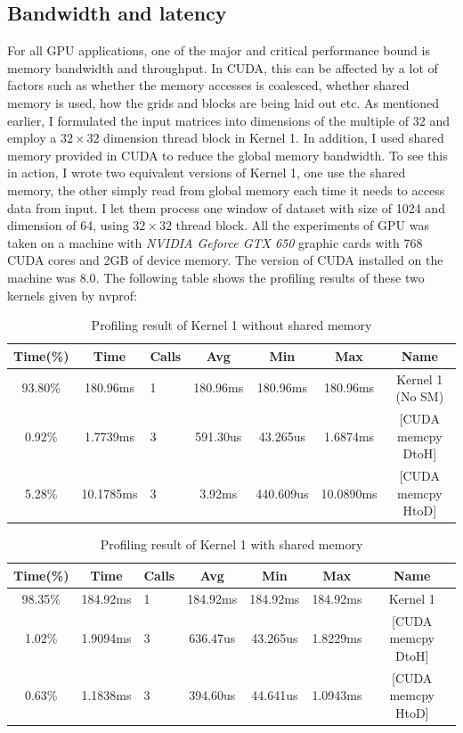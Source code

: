 \documentclass[11pt]{article}       %
\begin{document}
\subsection{Bandwidth and latency}

For all GPU applications, one of the major and critical performance bound is memory bandwidth and throughput. In CUDA, this can be affected by a lot of factors such as whether the memory accesses is coalesced, whether shared memory is used, how the grids and blocks are being laid out etc. As mentioned earlier, I formulated the input matrices into dimensions of the multiple of 32 and employ a $32 \times 32$ dimension thread block in Kernel 1. In addition, I used shared memory provided in CUDA to reduce the global memory bandwidth. To see this in action, I wrote two equivalent versions of Kernel 1, one use the shared memory, the other simply read from global memory each time it needs to access data from input. I let them process one window of dataset with size of 1024 and dimension of 64, using $32 \times 32$ thread block. All the experiments of GPU was taken on a machine with \textit{NVIDIA Geforce GTX 650} graphic cards with 768 CUDA cores and 2GB of device memory.  The version of CUDA installed on the machine was $8.0$. The following table shows the profiling results of these two kernels given by nvprof:

\begin{table}[ht]
\centering
\caption{Profiling result of Kernel 1 without shared memory}
\begin{tabular}{|c|c|l|c|c|c|c|} 
\hline
Time(\%) & Time      & Calls & Avg      & Min& Max& Name                            \\ 
\hline
93.80\%  & 180.96ms  & 1     & 180.96ms & 180.96ms& 180.96ms& Kernel 1 (No SM)              \\ 
\hline
0.92\%   & 1.7739ms  & 3     & 591.30us & 43.265us& 1.6874ms& [CUDA memcpy DtoH]    \\ 
\hline
5.28\%   & 10.1785ms & 3     & 3.92ms   & 440.609us& 10.0890ms& [CUDA memcpy HtoD]  \\
\hline
\end{tabular}
\end{table}

\begin{table}[ht]
\centering
\caption{Profiling result of Kernel 1 with shared memory}
\begin{tabular}{|c|c|l|c|c|c|c|} 
\hline
Time(\%) & Time     & Calls & Avg      & Min& Max& Name                                  \\ 
\hline
98.35\%  & 184.92ms & 1     & 184.92ms & 184.92ms& 184.92ms& Kernel 1  \\ 
\hline
1.02\%   & 1.9094ms & 3     & 636.47us & 43.265us& 1.8229ms& [CUDA memcpy DtoH]          \\ 
\hline
0.63\%   & 1.1838ms & 3     & 394.60us & 44.641us& 1.0943ms& [CUDA memcpy HtoD]          \\
\hline
\end{tabular}
\end{table}
\end{document}

